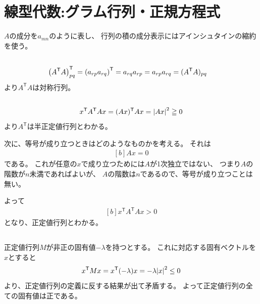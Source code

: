 \documentclass[../ap_2014.tex]{subfiles}
\begin{document}
\setcounter{chapter}{1}
\chapter{線型代数:グラム行列・正規方程式}
\(A\)の成分を\(a_{mn}\)のように表し、
行列の積の成分表示にはアインシュタインの縮約を使う。
\section{}
\begin{equation}\begin{aligned}[b]
    \qty(A^\mathsf{T}A)_{pq}^\mathsf{T}
    &= \qty(a_{rp}a_{rq})^\mathsf{T} = a_{rq}a_{rp}=a_{rp}a_{rq}=(A^\mathsf{T}A)_{pq}
\end{aligned}\end{equation}
より\(A^\mathsf{T}A\)は対称行列。

\section{}
\begin{equation}\begin{aligned}[b]
    x^\mathsf{T}A^\mathsf{T}Ax = (Ax)^\mathsf{T} Ax = \abs{Ax}^2 \geqq 0
\end{aligned}\end{equation}
より\(A^\mathsf{T}\)は半正定値行列とわかる。

次に、等号が成り立つときはどのようなものかを考える。
それは
\begin{equation}\begin{aligned}[b]
    Ax = 0
\end{aligned}\end{equation}
である。
これが任意の\(x\)で成り立つためには\(A\)が1次独立ではない、
つまり\(A\)の階数が\(n\)未満であればよいが、
\(A\)の階数は\(n\)であるので、等号が成り立つことは無い。

よって
\begin{equation}\begin{aligned}[b]
    x^\mathsf{T}A^\mathsf{T}Ax > 0
\end{aligned}\end{equation}
となり、正定値行列とわかる。

\section{}
正定値行列\(M\)が非正の固有値\(-\lambda\)を持つとする。
これに対応する固有ベクトルを\(x\)とすると
\begin{equation}\begin{aligned}[b]
    x^\mathsf{T} Mx = x^\mathsf{T} (-\lambda)x = -\lambda\abs{x}^2 \leq0
\end{aligned}\end{equation}
より、正定値行列の定義に反する結果が出て矛盾する。
よって正定値行列の全ての固有値は正である。
\end{document}
